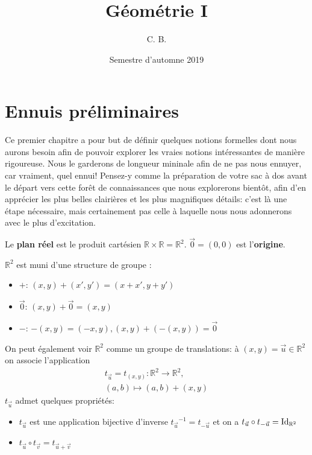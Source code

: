 \documentclass{book}
\title{Géométrie I}
\author{C. B.}
\date{Semestre d'automne 2019}
\numberwithin{equation}{section}
\providecommand{\plan}{{\mathbb R^2}}
\providecommand{\origin}{{\vec 0}}
\providecommand{\id}{{\textnormal{Id}}}
\providecommand{\IdR}{{\id_\plan}}
\providecommand{\trans}[1]{{t_{#1}}}
\begin{document}
\maketitle

\chapter*{Ennuis préliminaires}

Ce premier chapitre a pour but de définir quelques notions formelles dont nous aurons besoin afin de pouvoir explorer les vraies notions intéressantes de manière rigoureuse. Nous le garderons de longueur mininale afin de ne pas nous ennuyer, car vraiment, quel ennui! Pensez-y comme la préparation de votre sac à dos avant le départ vers cette forêt de connaissances que nous explorerons bientôt, afin d'en apprécier les plus belles clairières et les plus magnifiques détails: c'est là une étape nécessaire, mais certainement pas celle à laquelle nous nous adonnerons avec le plus d'excitation.

\begin{defn}
	Le \textbf{plan réel} est le produit cartésien $\mathbb R \times \mathbb R = \plan$. $\origin = (0, 0)$ est l'\textbf{origine}.\par
	$\plan$ est muni d'une structure de groupe :
	\begin{itemize}
		\item $+$: $(x, y) + (x', y') = (x+x', y+y')$
		\item $\origin$: $(x, y) + \origin = (x, y)$
		\item $-$: $-(x, y) = (-x, y), (x, y) + (-(x, y)) = \origin$
	\end{itemize}
	On peut également voir $\plan$ comme un groupe de translations: à $(x, y) = \vec u \in \plan$ on associe l'application
	\begin{align*}
		\trans{\vec u} = \trans{(x, y)} : \plan \to \plan,\\ (a, b) \mapsto (a, b) + (x, y)
	\end{align*}
	$\trans{\vec u}$ admet quelques propriétés:
	\begin{itemize}
		\item $\trans{\vec u}$ est une application bijective d'inverse $\trans{\vec u}^{-1} = \trans{-\vec u}$ et on a $\trans{\vec u} \circ \trans{-\vec u} = \IdR$
		\item $\trans{\vec u} \circ \trans{\vec v} = \trans{\vec u + \vec v}$
	\end{itemize}
\end{defn}
\end{document}
